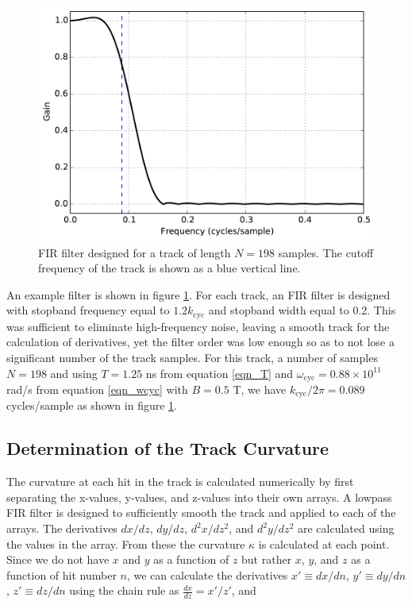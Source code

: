 \documentclass{JINST}
\begin{document}
\begin{figure}[!htb]
	\centering
	\includegraphics[scale=0.48]{fig/FIR_freq_resp_nmagse2_6.pdf}
	\caption{\label{fig_FIR}FIR filter designed for a track of length $N = 198$ samples.  The cutoff frequency of the track is shown as a blue vertical line.}
\end{figure}

An example filter is shown in figure \ref{fig_FIR}.  For each track, an FIR filter is designed with stopband frequency equal 
to $1.2k_{\mathrm{cyc}}$ and stopband width equal to 0.2.  This was sufficient to eliminate high-frequency noise, 
leaving a smooth track for the calculation of derivatives, yet the filter order was low enough so as to not lose a 
significant number of the track samples.  For this track, a number of samples $N = 198$ and using $T = 1.25$ ns from 
equation \ref{eqn_T} and $\omega_{\mathrm{cyc}} = 0.88 \times 10^{11}$ rad/s from equation \ref{eqn_wcyc} 
with $B = 0.5$ T, we have $k_{\mathrm{cyc}}/2\pi = 0.089$ cycles/sample as shown in figure \ref{fig_FIR}.

\subsection{Determination of the Track Curvature}
The curvature at each hit in the track is calculated numerically by first separating the x-values, y-values, and z-values into their own arrays.  A lowpass FIR filter is designed to sufficiently smooth the track and applied to each of the arrays.  The derivatives $dx/dz$, $dy/dz$, $d^2x/dz^2$, and $d^2y/dz^2$ are calculated using the values in the array.  From these the curvature $\kappa$ is calculated at each point.  Since we do not have $x$ and $y$ as a function of $z$ but rather $x$, $y$, and $z$ as a function of hit number $n$, we can calculate the derivatives $x' \equiv dx/dn$, $y' \equiv dy/dn$, $z' \equiv dz/dn$ using the chain rule as $\frac{dx}{dz} = x'/z'$, and
\end{document}
